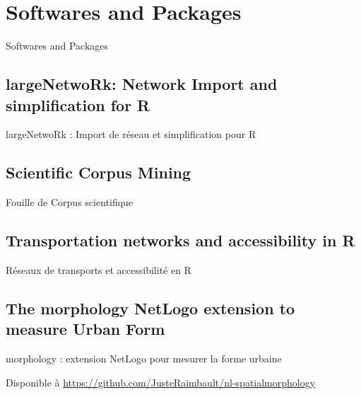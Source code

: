 
\newpage

\section{Softwares and Packages}{Softwares and Packages} %

\label{app:sec:packages} %










\subsection{largeNetwoRk: Network Import and simplification for R}{largeNetwoRk : Import de réseau et simplification pour R}



\subsection{Scientific Corpus Mining}{Fouille de Corpus scientifique}






\subsection{Transportation networks and accessibility in R}{Réseaux de transports et accessibilité en R}







\subsection{The morphology NetLogo extension to measure Urban Form}{morphology : extension NetLogo pour mesurer la forme urbaine}

\label{app:subsec:morphologyextension}


Disponible à \url{https://github.com/JusteRaimbault/nl-spatialmorphology}












